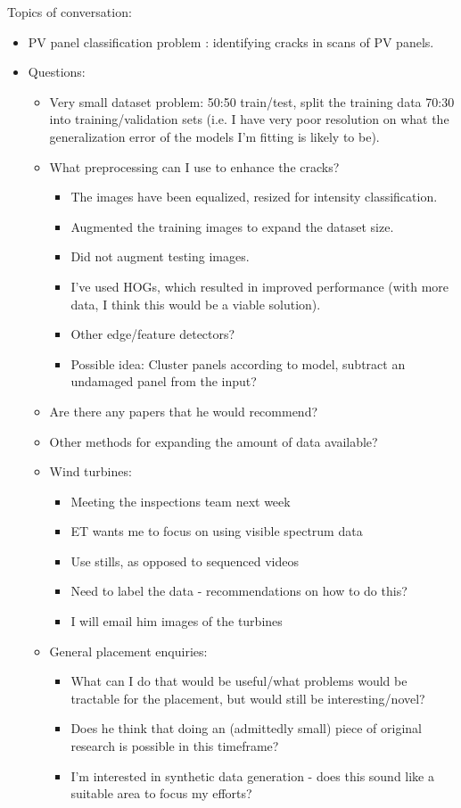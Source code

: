 \documentclass[idxtotoc,hyperref,openany]{labbook} %
\begin{document}
Topics of conversation:
\begin{itemize}
	\item PV panel classification problem : identifying cracks in scans of PV panels.
	\item Questions:
	\begin{itemize}
		\item Very small dataset problem: 50:50 train/test, split the training data 70:30 into training/validation sets (i.e. I have very poor resolution on what the generalization error of the models I'm fitting is likely to be).
		\item What preprocessing can I use to enhance the cracks?
			\begin{itemize}
				\item The images have been equalized, resized for intensity classification.
				\item Augmented the training images to expand the dataset size.
				\item Did not augment testing images.
				\item I've used HOGs, which resulted in improved performance (with more data, I think this would be a viable solution).
				\item Other edge/feature detectors?
				\item Possible idea: Cluster panels according to model, subtract an undamaged panel from the input?
			\end{itemize}
		\item Are there any papers that he would recommend?
		\item Other methods for expanding the amount of data available?
	\item Wind turbines:
		\begin{itemize}
			\item Meeting the inspections team next week
			\item ET wants me to focus on using visible spectrum data
			\item Use stills, as opposed to sequenced videos
			\item Need to label the data - recommendations on how to do this?
			\item I will email him images of the turbines
		\end{itemize}
	\item General placement enquiries:
		\begin{itemize}
			\item What can I do that would be useful/what problems would be tractable for the placement, but would still be interesting/novel?
			\item Does he think that doing an (admittedly small) piece of original research is possible in this timeframe?
			\item I'm interested in synthetic data generation - does this sound like a suitable area to focus my efforts?
		\end{itemize}
	\end{itemize}
\end{itemize}
\end{document}
